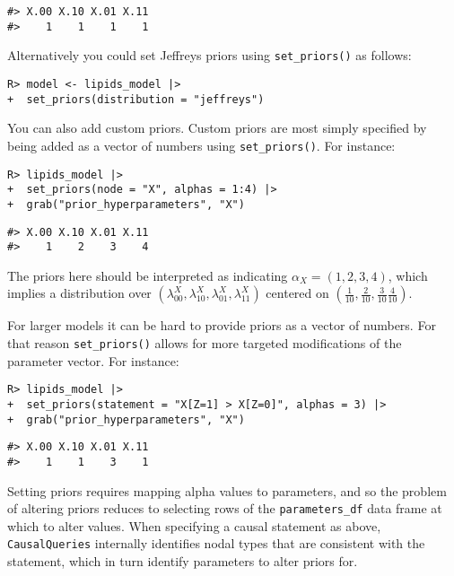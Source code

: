 \documentclass[
  11pt,
  article]{jss}
\begin{document}
\begin{verbatim}
#> X.00 X.10 X.01 X.11 
#>    1    1    1    1
\end{verbatim}

Alternatively you could set Jeffreys priors using \texttt{set\_priors()}
as follows:

\begin{verbatim}
R> model <- lipids_model |> 
+  set_priors(distribution = "jeffreys")
\end{verbatim}

You can also add custom priors. Custom priors are most simply specified
by being added as a vector of numbers using \texttt{set\_priors()}. For
instance:

\begin{verbatim}
R> lipids_model |> 
+  set_priors(node = "X", alphas = 1:4) |> 
+  grab("prior_hyperparameters", "X")
\end{verbatim}

\begin{verbatim}
#> X.00 X.10 X.01 X.11 
#>    1    2    3    4
\end{verbatim}

The priors here should be interpreted as indicating
\(\alpha_X = (1,2, 3, 4)\), which implies a distribution over
\((\lambda^X_{00},\lambda^X_{10}, \lambda^X_{01}, \lambda^X_{11})\)
centered on
\(\left(\frac1{10}, \frac2{10}, \frac3{10} \frac4{10} \right)\).

For larger models it can be hard to provide priors as a vector of
numbers. For that reason \texttt{set\_priors()} allows for more targeted
modifications of the parameter vector. For instance:

\begin{verbatim}
R> lipids_model |>
+  set_priors(statement = "X[Z=1] > X[Z=0]", alphas = 3) |>
+  grab("prior_hyperparameters", "X")
\end{verbatim}

\begin{verbatim}
#> X.00 X.10 X.01 X.11 
#>    1    1    3    1
\end{verbatim}

Setting priors requires mapping alpha values to parameters, and so the
problem of altering priors reduces to selecting rows of the
\texttt{parameters\_df} data frame at which to alter values. When
specifying a causal statement as above, \texttt{CausalQueries}
internally identifies nodal types that are consistent with the
statement, which in turn identify parameters to alter priors for.
\end{document}
